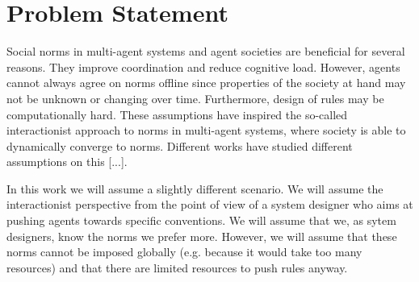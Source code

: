 \section{Problem Statement}


Social norms in multi-agent systems and agent societies are beneficial for several reasons.
They improve coordination and reduce cognitive load. %
However, agents cannot always agree on norms offline since properties of the society at hand may not be unknown or changing over time.
Furthermore, design of rules may be computationally hard.
These assumptions have inspired the so-called interactionist approach to norms in multi-agent systems, %
where society is able to dynamically converge to norms.
Different works have studied different assumptions on this [...]. %

In this work we will assume a slightly different scenario. We will
assume the interactionist perspective %
from the point of view of a system designer who aims at pushing
agents towards specific conventions. We will assume that we, as sytem
designers, know the norms we prefer more.
However, we will assume that  these norms cannot
be imposed globally (e.g. because it would take too many resources)
and that there are limited resources to push rules anyway.
\begin{comment}
Two cases here:
- Is it possible to push norms that are equivalent from the agent's
point of view? (coordination games)
- Is it possible to push norms that are not the same from the agent's 
point of view? And if yes, which? (Think of the Prisoner's dilemma
case).
\end{comment}
